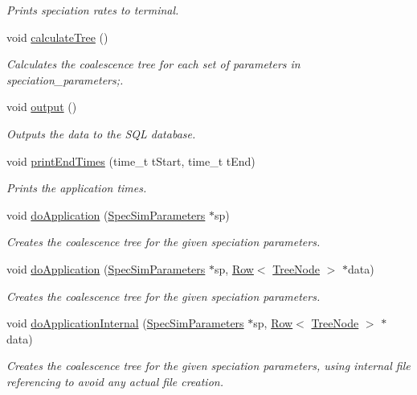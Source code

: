 \begin{DoxyCompactItemize}
\begin{DoxyCompactList}\small\item\em Prints speciation rates to terminal. \end{DoxyCompactList}\item 
void \hyperlink{group___community_objects_adfa9a1c84bb326092805614ad195fcdd}{calculate\+Tree} ()\hypertarget{group___community_objects_adfa9a1c84bb326092805614ad195fcdd}{}\label{group___community_objects_adfa9a1c84bb326092805614ad195fcdd}

\begin{DoxyCompactList}\small\item\em Calculates the coalescence tree for each set of parameters in speciation\+\_\+parameters;. \end{DoxyCompactList}\item 
void \hyperlink{group___community_objects_ad2483623c7ad7a11564fc49305204585}{output} ()
\begin{DoxyCompactList}\small\item\em Outputs the data to the S\+QL database. \end{DoxyCompactList}\item 
void \hyperlink{group___community_objects_a36216913433e3e011ee2420e83e1fe4a}{print\+End\+Times} (time\+\_\+t t\+Start, time\+\_\+t t\+End)
\begin{DoxyCompactList}\small\item\em Prints the application times. \end{DoxyCompactList}\item 
void \hyperlink{group___community_objects_a8ce443a30731d2249852d2b615f4a29a}{do\+Application} (\hyperlink{struct_spec_sim_parameters}{Spec\+Sim\+Parameters} $\ast$sp)
\begin{DoxyCompactList}\small\item\em Creates the coalescence tree for the given speciation parameters. \end{DoxyCompactList}\item 
void \hyperlink{group___community_objects_a7289dd39ee9b69ca314e1752a7b45701}{do\+Application} (\hyperlink{struct_spec_sim_parameters}{Spec\+Sim\+Parameters} $\ast$sp, \hyperlink{class_row}{Row}$<$ \hyperlink{class_tree_node}{Tree\+Node} $>$ $\ast$data)
\begin{DoxyCompactList}\small\item\em Creates the coalescence tree for the given speciation parameters. \end{DoxyCompactList}\item 
void \hyperlink{group___community_objects_aee7488d02cccb897ed1d561e242391df}{do\+Application\+Internal} (\hyperlink{struct_spec_sim_parameters}{Spec\+Sim\+Parameters} $\ast$sp, \hyperlink{class_row}{Row}$<$ \hyperlink{class_tree_node}{Tree\+Node} $>$ $\ast$data)
\begin{DoxyCompactList}\small\item\em Creates the coalescence tree for the given speciation parameters, using internal file referencing to avoid any actual file creation. \end{DoxyCompactList}\end{DoxyCompactItemize}

